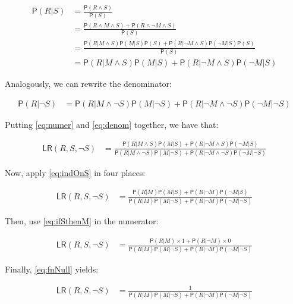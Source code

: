 \documentclass[10pt,dvipsnames,enabledeprecatedfontcommands]{scrartcl}
\newcommand{\n}{\neg}
\newcommand{\et}{\wedge}
\newcommand{\pr}[1]{\mathsf{P}(#1)}
\begin{document}
\begin{align}
\label{eq:numer}
\pr{R\vert S} & = \frac{\pr{R\et S}}{\pr{S}} \\ \nonumber
& = \frac{\pr{R \et M \et S} + \pr{R \et \n M \et S}}
{\pr{S}}  \\ \nonumber
& = \frac{\pr{R \vert M \et S}\pr{M \vert S}\pr{S} + \pr{R \vert \n M \et S}\pr{\n M \vert S}\pr{S}}
{\pr{S}}  \\ \nonumber 
& = \pr{R \vert M \et S}\pr{M \vert S} + \pr{R \vert \n M \et S}\pr{\n M \vert S}
\end{align}

\noindent  Analogously, we can rewrite the denominator:

\begin{align}
\label{eq:denom}
\pr{R \vert \n S} & = \pr{R \vert M \et \n S}\pr{M \vert \n S} +
\pr{R \vert \n M \et \n S}\pr{\n M \vert \n S}
\end{align}

Putting \eqref{eq:numer} and \eqref{eq:denom} together, we have that:

\begin{align}
\label{eq:LRfp1}
\mathsf{LR}(R,S, \n S) & = \frac{\pr{R \vert M \et S}\pr{M \vert S} + \pr{R \vert \n M \et S}\pr{\n M \vert S}}
{\pr{R \vert M \et \n S}\pr{M \vert \n S} +
\pr{R \vert \n M \et \n S}\pr{\n M \vert \n S}}
\end{align}

Now, apply \eqref{eq:indOnS} in four places:

\begin{align}
\label{eq:LRfp2}
\mathsf{LR}(R,S, \n S) & = \frac{
\pr{R \vert M}\pr{M \vert S} + \pr{R \vert \n M}\pr{\n M \vert S}
}{
\pr{R \vert M }\pr{M \vert \n S} +
\pr{R \vert \n M}\pr{\n M \vert \n S}
}
\end{align}

Then, use \eqref{eq:ifSthenM} in the numerator:

\begin{align}
\label{eq:LRfp3}
\mathsf{LR}(R,S, \n S) & = \frac{
\pr{R \vert M} \times 1 + \pr{R \vert \n M}\times 0
}{
\pr{R \vert M }\pr{M \vert \n S} +
\pr{R \vert \n M}\pr{\n M \vert \n S}
}
\end{align}

Finally, \eqref{eq:fnNull} yields:

\begin{align}
\label{eq:LRfp4}
\mathsf{LR}(R,S, \n S) & = \frac{1}
{\pr{R \vert  M}\pr{ M \vert \n S} + \pr{R \vert \n M}\pr{\n M \vert \n S}}
\end{align}
\end{document}
